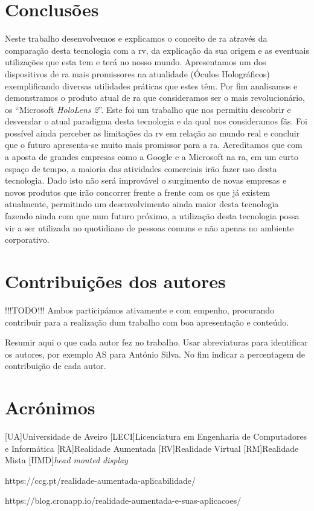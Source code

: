 \documentclass{report}
\begin{document}
\chapter{Conclusões}
\label{chap.conclusao}
Neste trabalho desenvolvemos e explicamos o conceito de \ac{ra} através da comparação desta tecnologia com a \ac{rv}, da explicação da sua origem e as eventuais utilizações que esta tem e terá no nosso mundo. Apresentamos um dos dispositivos de \ac{ra} mais promissores na atualidade (Óculos Holográficos) exemplificando diversas utilidades práticas que estes têm. Por fim analisamos e demonstramos o produto atual de \ac{ra} que consideramos ser o mais revolucionário, os “Microsoft \textit{HoloLens 2}”. Este foi um trabalho que nos permitiu descobrir e desvendar o atual paradigma desta tecnologia e da qual nos consideramos fãs. Foi possível ainda perceber as limitações da \ac{rv} em relação ao mundo real e concluir que o futuro apresenta-se muito mais promissor para a \ac{ra}. Acreditamos que com a aposta de grandes empresas como a Google e a Microsoft na \ac{ra}, em um curto espaço de tempo, a maioria das atividades comerciais irão fazer uso desta tecnologia. Dado isto não será improvável o surgimento de novas empresas e novos produtos que irão concorrer frente a frente com os que já existem atualmente, permitindo um desenvolvimento ainda maior desta tecnologia fazendo ainda com que num futuro próximo, a utilização desta tecnologia possa vir a ser utilizada no quotidiano de pessoas comuns e não apenas no ambiente corporativo.

\chapter*{Contribuições dos autores}
!!!TODO!!! Ambos participámos ativamente e com empenho, procurando contribuir para a realização dum trabalho com boa apresentação e conteúdo.

Resumir aqui o que cada autor fez no trabalho. Usar abreviaturas para identificar os autores, por exemplo AS para António Silva. No fim indicar a percentagem de contribuição de cada autor.

\chapter*{Acrónimos}
\begin{acronym}
[UA]{Universidade de Aveiro}
[LECI]{Licenciatura em Engenharia de Computadores e Informática}
[RA]{Realidade Aumentada}
[RV]{Realidade Virtual}
[RM]{Realidade Mista}
[HMD]{\textit{head mouted display}}
\end{acronym}

\printbibliography

https://ccg.pt/realidade-aumentada-aplicabilidade/

https://blog.cronapp.io/realidade-aumentada-e-suas-aplicacoes/
\end{document}
